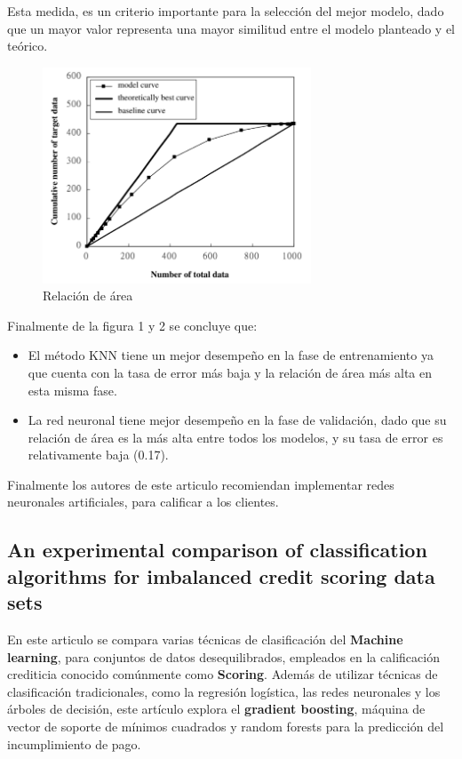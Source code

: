 \documentclass[conference]{IEEEtran}
\begin{document}
Esta medida, es un criterio importante para la selección del mejor modelo, dado que un mayor valor representa una mayor similitud entre el modelo planteado y el teórico.
\begin{center}
    \begin{figure}[H]
        \hfill
            \includegraphics[width=8cm]{areaRatio.png}\hspace*{\fill}
    \caption{Relación de  área}
    \label{fig:login}
    \end{figure}  
\end{center}

Finalmente de la figura 1 y 2 se concluye que:
\begin{itemize}
\item El método KNN tiene un mejor desempeño en la fase de entrenamiento ya que cuenta con la tasa de error más baja y la relación de área más alta en esta misma fase. 
\item La red neuronal tiene mejor desempeño en la fase de validación, dado que su relación de área es la más alta entre todos los modelos, y su tasa de error es relativamente baja (0.17).
\end{itemize}
Finalmente los autores de este articulo recomiendan implementar redes neuronales artificiales, para calificar a los clientes.

\subsection{An experimental comparison of classification algorithms for imbalanced credit scoring data sets}

En este articulo se \cite{articulo2} compara varias técnicas de clasificación del \textbf{Machine learning}, para conjuntos de datos desequilibrados,  empleados en la calificación crediticia conocido comúnmente como \textbf{Scoring}.
Además de utilizar técnicas de clasificación tradicionales, como la regresión logística, las redes neuronales y los árboles de decisión, este artículo explora el \textbf{gradient boosting}, máquina de vector de soporte de mínimos cuadrados y random forests para la predicción del incumplimiento de pago.
\end{document}
